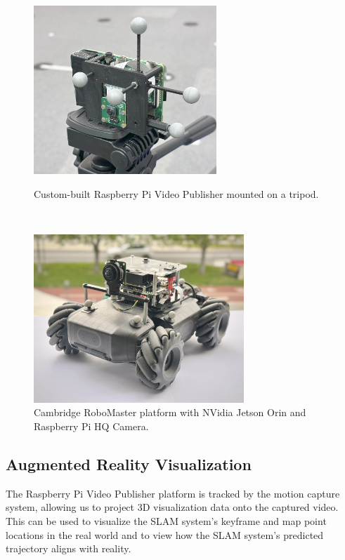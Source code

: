 \begin{figure}[h]
    \centering
    \captionsetup{format=plain}
    \begin{minipage}[t]{0.475\linewidth}
        \centering
        \includegraphics[height=2.5in]{figures/rpi_cam.jpg}

        \caption{Custom-built Raspberry Pi Video Publisher mounted on a tripod.}
        \label{fig:rpi-cam}
    \end{minipage}\hfill%
    ~
    \begin{minipage}[t]{0.475\linewidth}
        \centering
        \includegraphics[height=2.5in]{figures/robomaster.jpg}
        \caption{Cambridge RoboMaster platform with NVidia Jetson Orin and Raspberry Pi HQ Camera.}
        \label{fig:tum-traj}
    \end{minipage}
\end{figure}


\subsection{Augmented Reality Visualization}
\label{sec:augmented-reality-visualization}
The Raspberry Pi Video Publisher platform is tracked by the motion capture system, allowing us to project 3D visualization data onto the captured video. This can be used to visualize the SLAM system's keyframe and map point locations in the real world and to view how the SLAM system's predicted trajectory aligns with reality.

